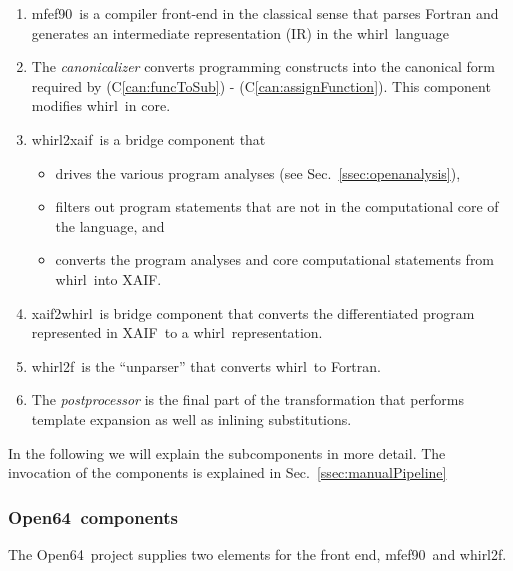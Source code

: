 \documentclass[11pt]{article}
\newcommand{\mfefninety}{mfef90}
\newcommand{\OpenSixtyFour}{Open64}
\newcommand{\xaif}{XAIF}
\newcommand{\whirl}{whirl}
\newcommand{\whirlToxaif}{whirl2xaif}
\newcommand{\whirlTof}{whirl2f}
\newcommand{\xaifTowhirl}{xaif2whirl}
\newcommand{\refcan}[1]{(C\ref{#1})}
\newcommand{\refsec}[1]{{Sec.~\ref{#1}}}
\begin{document}
\begin{enumerate}	
\item \mfefninety\ is a compiler front-end in the classical sense that parses
Fortran and generates an intermediate representation (IR)
in the \whirl\ language

\item The {\em canonicalizer} converts  
programming constructs into the canonical form required by 
\refcan{can:funcToSub} - \refcan{can:assignFunction}. 
This component modifies \whirl\ in core.

\item \whirlToxaif\ is a bridge component that
\begin{itemize}
\item drives the various program analyses (see \refsec{ssec:openanalysis}),

\item filters out program statements that are not in the
computational core of the language, and 

\item converts the program analyses and core computational
statements from \whirl\ into \xaif.
\end{itemize}

\item \xaifTowhirl\ is bridge component that converts the 
differentiated program represented in \xaif\ 
to a \whirl\ representation.

\item \whirlTof\ is the ``unparser'' that converts \whirl\ to
Fortran.

\item The {\em postprocessor} is the  final part of the transformation that
performs template expansion as well as inlining substitutions.

\end{enumerate}

In the following we will explain the subcomponents in more detail.
The invocation of the components is explained in
\refsec{ssec:manualPipeline}

\subsubsection{\OpenSixtyFour\ components} \label{sssec:mfef}

The \OpenSixtyFour\ project \cite{open64Web} supplies two elements for
the front end, \mfefninety\ and \whirlTof.
\end{document}
